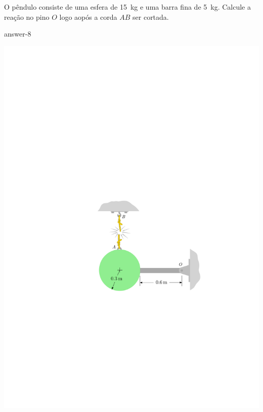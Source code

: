\item O pêndulo consiste de uma esfera de \SI{15}{\kilogram} e uma barra fina de \SI{5}{\kilogram}. Calcule a reação no pino $O$ logo aopós a corda $AB$ ser cortada.

{answer-8}

\vspace{-.7cm}
\begin{flushright}
	\includegraphics[scale=1.1]{../../images/draw_7}
\end{flushright}